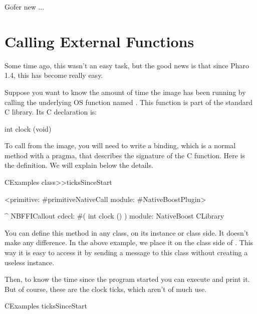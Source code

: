 \documentclass[a4paper,10pt,twoside]{book}
\begin{document}

\begin{code}{}
Gofer new
	...

\end{code}


\section{Calling External Functions}

Some time ago, this wasn't an easy task, but the good news is that since Pharo 1.4, this has become really easy.

Suppose you want to know the amount of time the image has been running by calling the underlying OS function named . 
This function is part of the standard C library. Its C declaration is:

\begin{code}{}
int clock (void)
\end{code}

To call  from the image, you will need to write a binding, which is a normal method with a 
pragma, that describes the signature of the C function. Here is the definition. We will explain below the details.

\begin{code}{}
CExamples class>>ticksSinceStart

	<primitive: #primitiveNativeCall module: #NativeBoostPlugin>
	
	^ NBFFICallout cdecl: #( int clock () ) module: NativeBoost CLibrary
\end{code}

You can define this method in any class, on its instance or class side.
It doesn't make any difference. 
In the above example, we place it on the class side of . 
This way it is easy to access it by sending a message to this class without creating a useless instance. 

Then, to know the time since the program started you can execute and print it.
But of course, these are the clock ticks, which aren't of much use. 
\begin{code}{}
CExamples ticksSinceStart
\end{code}
\end{document}
